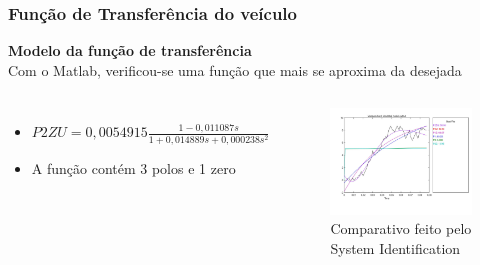 \begin{frame}
\frametitle{Função de Transferência do veículo}
\textbf{Modelo da função de transferência}\\
Com o Matlab, verificou-se uma função que mais se aproxima da desejada
	
\begin{columns}
 		
 	\vspace{-0.5cm}
 	\begin{itemize}
 	\item $P2ZU = 0,0054915\frac{1-0,011087s}{1+0,014889s+0,000238s^2}$
 	\item A função contém 3 polos e 1 zero
 	\end{itemize}
 	

	\begin{figure}[th]
	\centering
	\captionsetup{width=0.9\textwidth,font=footnotesize,textfont=bf}
	\includegraphics[width=\linewidth,keepaspectratio]{Figuras/Comparativo.pdf}
	\caption{Comparativo feito pelo System Identification}				
	\end{figure}
	
\end{columns}
\end{frame}

